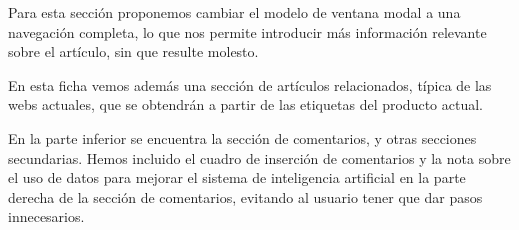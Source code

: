 Para esta sección proponemos cambiar el modelo de ventana modal a una navegación completa, lo que nos permite introducir más información relevante sobre el artículo, sin que resulte molesto.

En esta ficha vemos además una sección de artículos relacionados, típica de las webs actuales, que se obtendrán a partir de las etiquetas del producto actual.

En la parte inferior se encuentra la sección de comentarios, y otras secciones secundarias. Hemos incluido el cuadro de inserción de comentarios y la nota sobre el uso de datos para mejorar el sistema de inteligencia artificial en la parte derecha de la sección de comentarios, evitando al usuario tener que dar pasos innecesarios.

